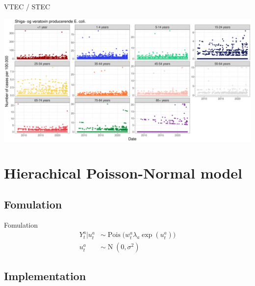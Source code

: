 \documentclass[aspectratio=169]{beamer}
\DeclareMathOperator{\N}{N}
\DeclareMathOperator{\Pois}{Pois}
\begin{document}
\begin{frame}{VTEC / STEC}
\tiny

\includegraphics[width=1\linewidth]{../figures/ShigaogveratoxinproducerendeEcolixAgeGroup}

\normalsize
\end{frame}

\hypertarget{hierachical-poisson-normal-model}{%
\section{Hierachical Poisson-Normal
model}\label{hierachical-poisson-normal-model}}

\hypertarget{fomulation}{%
\subsection{Fomulation}\label{fomulation}}

\begin{frame}{Fomulation}
\begin{subequations}
  \begin{alignat}{2}
    Y_{t}^{a}|u_{t}^{a} &\sim \Pois \big( w_{t}^{a} \lambda_{a} \exp(u_{t}^{a}) \big) \label{eq:pois_ln0} \\ 
    u_{t}^{a} &\sim \N(0,\sigma^2) \label{eq:pois_ln1}
  \end{alignat}
\end{subequations}
\end{frame}

\hypertarget{implementation}{%
\subsection{Implementation}\label{implementation}}
\end{document}
